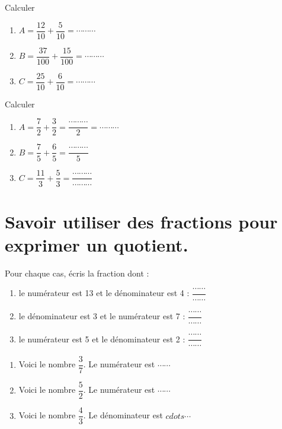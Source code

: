 
Calculer

\begin{enumerate}
\item $A = \dfrac{12}{10} +\dfrac{5}{10} =  \cdots\cdots\cdots  $
\item $B = \dfrac{37}{100} +\dfrac{15}{100} =  \cdots\cdots\cdots  $
\item $C = \dfrac{25}{10} +\dfrac{6}{10} =  \cdots\cdots\cdots $
\end{enumerate}




Calculer

\begin{enumerate}
\item $A = \dfrac{7}{2} +\dfrac{3}{2} = \dfrac{\cdots\cdots\cdots }{2} =  \cdots\cdots\cdots  $
\item $B = \dfrac{7}{5} +\dfrac{6}{5} = \dfrac{\cdots\cdots\cdots }{5} $
\item $C = \dfrac{11}{3} +\dfrac{5}{3} = \dfrac{\cdots\cdots\cdots }{\cdots\cdots\cdots } $
\end{enumerate}



\section{Savoir utiliser des fractions pour exprimer un quotient.}




Pour chaque cas, écris la fraction dont :
\begin{enumerate}
\item le numérateur est 13 et le dénominateur est 4 : $\dfrac{\cdots\cdots}{\cdots\cdots} $
\item le dénominateur est 3 et le numérateur est 7  : $\dfrac{\cdots\cdots}{\cdots\cdots} $
\item le numérateur est 5 et le dénominateur est 2 : $\dfrac{\cdots\cdots}{\cdots\cdots} $
\end{enumerate}



\begin{enumerate}
\item Voici le nombre $\dfrac{3}{7}$. Le numérateur est $\cdots\cdots$
\item Voici le nombre $\dfrac{5}{2}$. Le numérateur est $\cdots\cdots$
\item Voici le nombre $\dfrac{4}{3}$. Le dénominateur est $cdots\cdots$
\end{enumerate}


